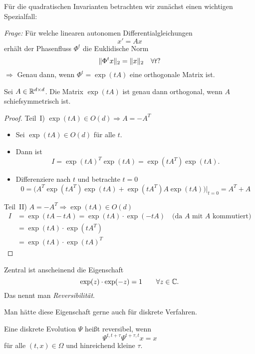 Für die quadratischen Invarianten betrachten wir zunächst einen wichtigen Spezialfall:

\medskip

\emph{Frage:} Für welche linearen autonomen Differentialgleichungen
\begin{equation*}
 x'=Ax
\end{equation*}
erhält der Phasenfluss $\Phi^t$ die Euklidische Norm
\begin{equation*}
	\lVert \Phi^t x \rVert_2 = \lVert x \rVert_2\quad\forall t?
\end{equation*}
$\Rightarrow$ Genau dann, wenn $\Phi^t = \exp(tA)$ eine orthogonale Matrix ist.
\begin{satz}
\label{thm:normerhaltende_fluesse}
 Sei $A\in\mathbb R^{d \times d}$. Die Matrix $\exp(tA)$ ist genau dann orthogonal,
 wenn $A$ schiefsymmetrisch ist.
\end{satz}
\begin{proof}
 Teil~I) $\exp(tA)\in O(d) \Rightarrow A=-A^T$
 \begin{itemize}
  \item Sei $\exp(tA)\in O(d)$ für alle $t$.
  \item Dann ist
   \begin{equation*}
    I = \exp(tA)^T \exp(tA) = \exp(tA^T) \exp(tA).
   \end{equation*}
 \item Differenziere nach $t$ und betrachte $t=0$
  \begin{equation*}
   0=\Big(A^T \exp(tA^T) \exp(tA) + \exp(tA^T)A \exp(tA) \Big)\Big|_{t=0} = A^T+A
  \end{equation*}
	\end{itemize}
 Teil~II) $A=-A^T \Rightarrow \exp(tA)\in O(d)$
 \begin{align*}
	 I
	 &= \exp(tA-tA) = \exp(tA)\cdot \exp(-tA)\quad\text{(da $A$ mit $A$ kommutiert)}\\
	 &= \exp(tA)\cdot \exp(tA^T) \\
	 &= \exp(tA)\cdot \exp(tA)^T	 
 \end{align*}
\end{proof}
Zentral ist anscheinend die Eigenschaft
\begin{equation*}
	\exp(z)\cdot \exp(-z) = 1\qquad \forall z\in\mathbb C.
\end{equation*}
Das nennt man \emph{Reversibilität}.

\medskip

Man hätte diese Eigenschaft gerne auch für diskrete Verfahren.
\begin{definition}
	Eine diskrete Evolution $\Psi$ heißt reversibel, wenn
	\begin{equation*}
		\Psi^{t,t+\tau}\Psi^{t+\tau,t} x = x
	\end{equation*}
	für alle $(t,x)\in\Omega$ und hinreichend kleine $\tau$.
\end{definition}

